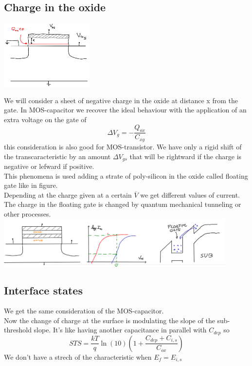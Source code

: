 \subsection{Charge in the oxide}

\centering
\includegraphics[width=0.35\textwidth]{qox.png}\\
\raggedright

We will consider a sheet of negative charge in the oxide at distance x from the gate. In MOS-capacitor we recover the ideal behaviour with the application of an extra voltage on the gate of 
\begin{equation}
\Delta V_g=-\frac{Q_{ox}}{C_{xg}}
\end{equation}
this consideration is also good for MOS-transistor. We have only a rigid shift of the transcaracteristic by an amount $\Delta V_{gs}$ that will be rightward if the charge is negative or lefward if positive.\\
This phenomena is used adding a strate of poly-silicon in the oxide called floating gate like in figure.\\
Depending at the charge given at a certain $\overline{V}$ we get different values of current. The charge in the floating gate is changed by quantum mechanical tunneling or other processes.\\

\centering
\includegraphics[width=0.9\textwidth]{flatinggate.png}\\
\raggedright


\subsection{Interface states}
We get the same consideration of the MOS-capacitor.\\
Now the change of charge at the surface is modulating the slope of the sub-threshold slope. It's like having another capacitance in parallel with $C_{dep}$ so
\begin{equation}
STS=\frac{kT}{q}\ln(10)\left(1+\frac{C_{dep}+C_{i,s}}{C_{ox}}\right)
\end{equation}
We don't have a strech of the characteristic when $E_f=E_{i,s}$

